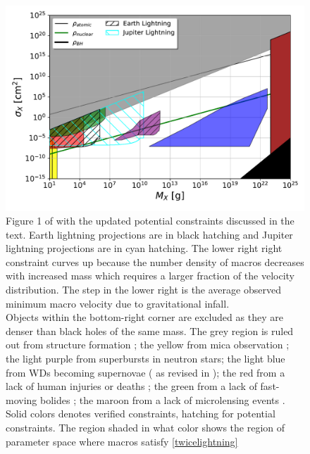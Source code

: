 \documentclass[%
 reprint,
 amsmath,amssymb,
 aps,
]{revtex4-2}
\begin{document}
    \begin{figure}
        \includegraphics[width=\textwidth]{lightning_constraints/lightningconstraints.pdf}
        \caption{
            Figure 1 of \cite{Sidhu2020reconsider} with the updated potential constraints discussed in the text. Earth lightning projections are in black hatching and Jupiter lightning projections are in cyan hatching. The lower right right constraint curves up because the number density of macros decreases with increased mass which requires a larger fraction of the velocity distribution. The step in the lower right is the average observed minimum macro velocity due to gravitational infall.
            \\
            Objects within the bottom-right corner are excluded as they are denser than black holes of the same mass. The grey region is ruled out from structure formation \cite{Wilkinson2014angular}; the yellow from mica observation \cite{DeRujula1984axn, Price1988ge};  the light purple from superbursts in neutron stars; the light blue from WDs becoming supernovae (\cite{Graham2018} as revised in \cite{Sidhu2020reconsider});  the red from a lack of human injuries or deaths \cite{Sidhu2019death}; the green from a lack of fast-moving bolides \cite{Sidhu2019bolide}; the maroon from a lack of microlensing events \cite{Niikura2019, Alcock2001, Tisserand2007, Carr2010, Griest2013}. Solid colors denotes verified constraints, hatching for potential constraints.
            The region shaded in {\color{red} what color} shows the region of parameter space where macros satisfy \eqref{twicelightning}
        }\label{fig:constraints}
    \end{figure}
\end{document}
